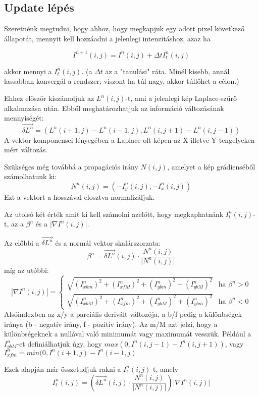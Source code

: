 \documentclass[10pt, draft]{article}
\begin{document}
\subsection{Update lépés}
Szeretnénk megtudni, hogy ahhoz, hogy megkapjuk egy adott pixel következő állapotát, mennyit kell hozzáadni a jelenlegi intenzitáshoz, azaz ha

\[ I^{n+1}(i, j) = I^n(i, j) + \Delta t I^{n}_{t} (i,j) \]

akkor mennyi a $I^{n}_t (i,j)$.
(a $\Delta t$ az a "tanulási" ráta. Minél kisebb, annál lassabban konvergál a rendszer; viszont ha túl nagy, akkor túllőhet a célon.)

Ehhez először kiszámoljuk az $L^n (i, j)$-t, ami a jelenlegi kép Laplace-szűrő alkalmazása után.
Ebből meghatározhatjuk az információ változásának mennyiségét:
\[ \overrightarrow{\delta L^{n}} = (L^n(i+1,j) - L^n(i-1,j), L^n(i,j+1) - L^n(i,j-1)) \]
A vektor komponensei lényegében a Laplace-olt képen az X illetve Y-tengelyeken mért változás.

Szükséges még továbbá a propagációs irány $N(i, j)$, amelyet a kép grádienséből számolhatunk ki:
\[ N^{n}(i, j) = (-I^{n}_y(i, j), -I^{n}_x(i, j)) \]
Ezt a vektort a hosszával elosztva normalizáljuk.

Az utolsó két érték amit ki kell számolni azelőtt, hogy megkaphatnánk $I^{n}_t (i,j)$-t,
az a $ \beta^n $ és a $ \lvert \nabla I^n(i, j) \rvert $.

Az előbbi a $ \overrightarrow{ \delta L^n } $ és a normál vektor skalárszorzata:
\[ \beta^{n} = \overrightarrow{ \delta L^n }(i, j) \cdot \frac{ N^n (i, j) }{ \lvert N^n (i, j) \rvert } \]
míg az utóbbi:
\[ | \nabla I^n(i, j) | =
\begin{cases}
    \sqrt{(I^n_{x b m})^2 + (I^n_{x f M})^2 + (I^n_{y b m})^2 + (I^n_{y b M})^2} &\mbox{ha } \beta^n > 0 \\
    \sqrt{(I^n_{x b M})^2 + (I^n_{x f m})^2 + (I^n_{y b M})^2 + (I^n_{y b m})^2} &\mbox{ha } \beta^n < 0
\end{cases}
\]
Alsóindexben az x/y a parciális derivált változója, a b/f pedig a különbségek iránya (b - negatív irány, f - pozitív irány).
Az m/M azt jelzi, hogy a különbségeknek a nullával való minimumát vagy maximumát vesszük.
Például a $I^n_{y b M}$-et definiálhatjuk úgy, hogy $ max(0, I^n(i, j - 1) - I^n(i, j + 1)) $,
vagy $I^n_{x f m} = min(0, I^n(i + 1, j) - I^n(i - 1, j)$

Ezek alapján már összetudjuk rakni a $ I^n_t(i, j) $-t, amely
\[ I^n_t (i, j) = (\overrightarrow{\delta L^n}(i, j) \cdot \frac{ N^n (i, j) }{ \lvert N^n (i, j) \rvert } ) \lvert \nabla I^n(i,j) \rvert \]
\end{document}

